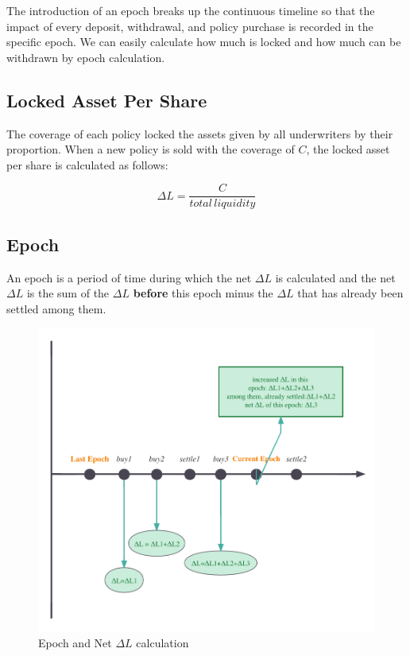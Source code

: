 The introduction of an epoch breaks up the continuous timeline so that the impact of every deposit, withdrawal, and policy purchase is recorded in the specific epoch.
We can easily calculate how much is locked and how much can be withdrawn by epoch calculation.

\subsection{Locked Asset Per Share}\label{subsec:locked-asset-per-share}

The coverage of each policy locked the assets given by all underwriters by their proportion.
When a new policy is sold with the coverage of $C$, the locked asset per share is calculated as follows:

\begin{equation}
	\Delta L = \frac{C}{total\,liquidity}\label{eq:equation2}
\end{equation}

\subsection{Epoch}\label{subsec:epoch}

An epoch is a period of time during which the net $\Delta L$ is calculated and the net $\Delta L$ is the sum of the $\Delta L$ \textbf{before} this epoch minus the $\Delta L$ that has already been settled among them.

\begin{figure}[H]
	\includegraphics[width=0.8\linewidth]{net_delta_impact}
	\centering
	\caption{Epoch and Net $\Delta L$ calculation} %
	\label{fig:epoch-and-net-delta-l} %
\end{figure}

